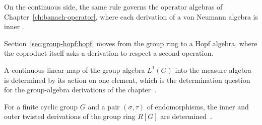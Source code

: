 On the continuous side, the same rule governs the operator algebras of
Chapter~\ref{ch:banach-operator}, where each derivation of a von Neumann
algebra is inner \cite[Theorem~15, p.~290]{Kadison1966}.

Section~\ref{sec:group-hopf:hopf} moves from the group ring to a Hopf algebra,
where the coproduct itself asks a derivation to respect a second operation.

A continuous linear map of the group algebra $L^1(G)$ into the measure algebra is determined by its action on one element, which is the determination question for the group-algebra derivations of the chapter~\cite{WlLinearMapsOnGroupAlgebrasDeter2019}.

For a finite cyclic group $G$ and a pair $(\sigma,\tau)$ of endomorphisms, the inner and outer twisted derivations of the group ring $R[G]$ are determined~\cite{WlInnerAndOuterTwistedDerivation2019}.
